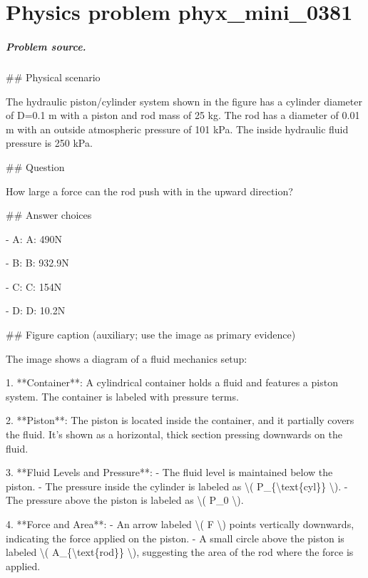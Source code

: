 
\chapter{Physics problem phyx\_mini\_0381}
\label{ch:PhyXMiniProblems_problem_phyx_mini_0381}

\paragraph{Problem source.}
\#\# Physical scenario

The hydraulic piston/cylinder system shown in the figure has a cylinder diameter of D=0.1 m with a piston and rod mass of 25 kg. The rod has a diameter of 0.01 m with an outside atmospheric pressure of 101 kPa. The inside hydraulic fluid pressure is 250 kPa.

\#\# Question

How large a force can the rod push with in the upward direction?

\#\# Answer choices

- A: A: 490N

- B: B: 932.9N

- C: C: 154N

- D: D: 10.2N

\#\# Figure caption (auxiliary; use the image as primary evidence)

The image shows a diagram of a fluid mechanics setup:

1. **Container**: A cylindrical container holds a fluid and features a piston system. The container is labeled with pressure terms.

2. **Piston**: The piston is located inside the container, and it partially covers the fluid. It's shown as a horizontal, thick section pressing downwards on the fluid.

3. **Fluid Levels and Pressure**: 
   - The fluid level is maintained below the piston.
   - The pressure inside the cylinder is labeled as \textbackslash{}( P\_\{\textbackslash{}text\{cyl\}\} \textbackslash{}).
   - The pressure above the piston is labeled as \textbackslash{}( P\_0 \textbackslash{}).

4. **Force and Area**:
   - An arrow labeled \textbackslash{}( F \textbackslash{}) points vertically downwards, indicating the force applied on the piston.
   - A small circle above the piston is labeled \textbackslash{}( A\_\{\textbackslash{}text\{rod\}\} \textbackslash{}), suggesting the area of the rod where the force is applied.

